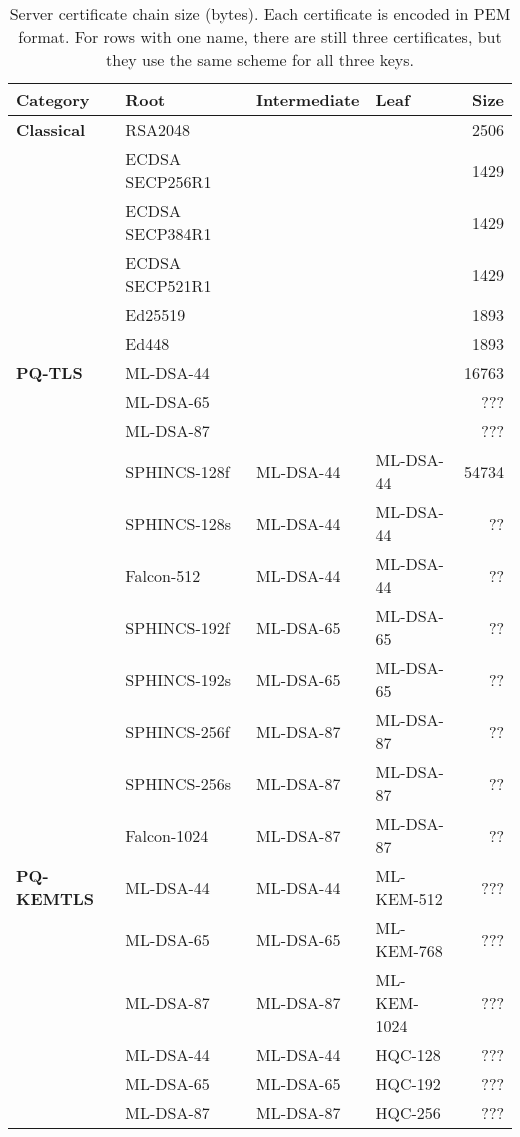 \documentclass[letterpaper,12pt,titlepage,oneside,final]{book}
\begin{document}
\begin{table}[p]
\centering
\caption{
    Server certificate chain size (bytes).
    Each certificate is encoded in PEM format.
    For rows with one name, there are still three certificates, but they use the same scheme for all three keys.
}
\vspace{1em}
\label{tab:cert-chain-sizes}
\footnotesize\begin{tabular}{llllr}
\toprule
    \textbf{Category} 
    & \textbf{Root} 
    & \textbf{Intermediate} 
    & \textbf{Leaf} 
    & \textbf{Size} 
    \\
\midrule
\textbf{Classical}
    & RSA2048           &&                 & 2506 \\
    & ECDSA SECP256R1   &&         & 1429 \\
    & ECDSA SECP384R1   &&         & 1429 \\
    & ECDSA SECP521R1   &&         & 1429 \\
    & Ed25519           &&                 & 1893 \\
    & Ed448             &&                 & 1893 \\
\midrule
\textbf{PQ-TLS}
    & ML-DSA-44 &&               & 16763 \\
    & ML-DSA-65 &&               & ??? \\
    & ML-DSA-87 &&               & ??? \\
    & SPHINCS-128f  & ML-DSA-44 & ML-DSA-44 & 54734 \\
    & SPHINCS-128s  & ML-DSA-44 & ML-DSA-44 & ?? \\
    & Falcon-512  & ML-DSA-44 & ML-DSA-44 & ?? \\
    & SPHINCS-192f  & ML-DSA-65 & ML-DSA-65 & ?? \\
    & SPHINCS-192s  & ML-DSA-65 & ML-DSA-65 & ?? \\
    & SPHINCS-256f  & ML-DSA-87 & ML-DSA-87 & ?? \\
    & SPHINCS-256s  & ML-DSA-87 & ML-DSA-87 & ?? \\
    & Falcon-1024  & ML-DSA-87 & ML-DSA-87 & ?? \\
\midrule
\textbf{PQ-KEMTLS}
    & ML-DSA-44 & ML-DSA-44 & ML-KEM-512 & ??? \\
    & ML-DSA-65 & ML-DSA-65 & ML-KEM-768 & ??? \\
    & ML-DSA-87 & ML-DSA-87 & ML-KEM-1024 & ??? \\
    & ML-DSA-44 & ML-DSA-44 & HQC-128 & ??? \\
    & ML-DSA-65 & ML-DSA-65 & HQC-192 & ??? \\
    & ML-DSA-87 & ML-DSA-87 & HQC-256 & ??? \\
\bottomrule
\end{tabular}
\end{table}
\end{document}
